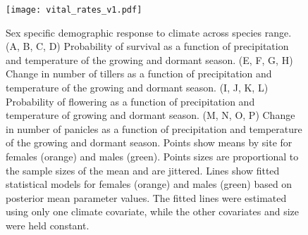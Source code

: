 \documentclass[9pt,twocolumn,twoside,lineno]{pnas-new}
\begin{document}
\begin{figure}[H]
\centering
\texttt{[image: vital\_rates\_v1.pdf]}
\caption{Sex specific demographic response to climate across species range.
			(A, B, C, D) Probability of survival as a function of precipitation and temperature of the growing and dormant season.
			(E, F, G, H) Change in number of tillers as a function of precipitation and temperature of the growing and dormant season.
			(I, J, K, L) Probability of flowering as a function of precipitation and temperature of growing and dormant season.
			(M, N, O, P) Change in number of panicles as a function of precipitation and temperature of the growing and dormant season.
			Points show means by site for females (orange) and males (green). 
			Points sizes are proportional to the sample sizes of the mean and are jittered.
			Lines show fitted statistical models for females (orange) and males (green) based on posterior mean parameter values.
			The fitted lines were estimated using only one climate covariate, while the other covariates and size were held constant.
			}
\label{fig:vital_rates}
\end{figure}
\clearpage
\end{document}
